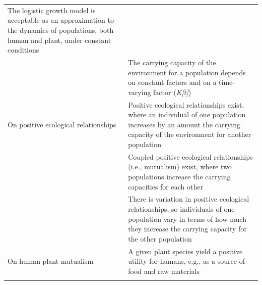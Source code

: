 \documentclass[
]{book}
\begin{document}
\begin{longtable}[]{@{}ll@{}}
\begin{minipage}[t]{0.49\columnwidth}
The logistic growth model is acceptable as an approximation to the dynamics of populations, both human and plant, under constant conditions\strut
\end{minipage}\tabularnewline
\begin{minipage}[t]{0.45\columnwidth}\raggedright
﻿\strut
\end{minipage} & \begin{minipage}[t]{0.49\columnwidth}\raggedright
The carrying capacity of the environment for a population depends on constant factors and on a time-varying factor (\emph{K{[}t{]}})\strut
\end{minipage}\tabularnewline
\begin{minipage}[t]{0.45\columnwidth}\raggedright
On positive ecological relationships\strut
\end{minipage} & \begin{minipage}[t]{0.49\columnwidth}\raggedright
Positive ecological relationships exist, where an individual of one population increases by an amount the carrying capacity of the environment for another population\strut
\end{minipage}\tabularnewline
\begin{minipage}[t]{0.45\columnwidth}\raggedright
﻿\strut
\end{minipage} & \begin{minipage}[t]{0.49\columnwidth}\raggedright
Coupled positive ecological relationships (i.e., mutualism) exist, where two populations increase the carrying capacities for each other\strut
\end{minipage}\tabularnewline
\begin{minipage}[t]{0.45\columnwidth}\raggedright
﻿\strut
\end{minipage} & \begin{minipage}[t]{0.49\columnwidth}\raggedright
There is variation in positive ecological relationships, so individuals of one population vary in terms of how much they increase the carrying capacity for the other population\strut
\end{minipage}\tabularnewline
\begin{minipage}[t]{0.45\columnwidth}\raggedright
On human-plant mutualism\strut
\end{minipage} & \begin{minipage}[t]{0.49\columnwidth}\raggedright
A given plant species yield a positive utility for humans, e.g., as a source of food and raw materials\strut
\end{minipage}\tabularnewline
\begin{minipage}[t]{0.45\columnwidth}\raggedright

\end{minipage}
\end{longtable}
\end{document}
